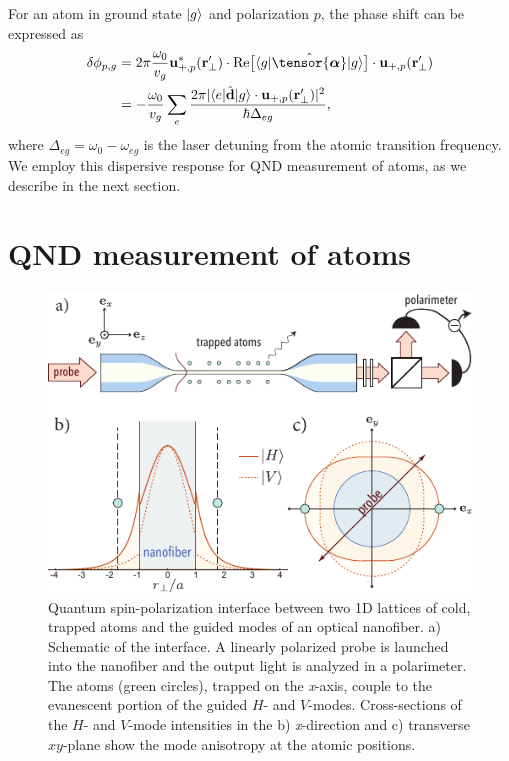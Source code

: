 \documentclass[aps,pra,twocolumn]{revtex4-1} %
\begin{document}
For an atom in ground state $\lvert{g}\rangle$ and polarization $p$, the phase shift can be expressed as \cite{le_kien_propagation_2014}
	\begin{align} \label{Eq::PhaseShiftMultilevel}
		\delta  \phi_{p,g} &=2\pi \frac{ \omega_{0}}{v_g} \mathbf{u}^*_{+, p}(\br'_\perp) \cdot {\rm Re}\big[\bra{g} 
\hat{\tensor{\boldsymbol{\alpha}}} \ket{g} \big] \cdot \mathbf{u}_{+, p}(\br'_\perp) \nn\\
&= - \frac{ \omega_{0} }{v_g} \sum_e \frac{2 \pi |\bra{e}\hat{\mathbf{d}}\ket{g} \cdot \mathbf{u}_{+,p}(\br'_\perp)|^2}{ \hbar  \Delta_{eg} } ,
	\end{align}
where $\Delta_{eg} = \omega_0 - \omega_{eg}$ is the laser detuning from the atomic transition frequency.  
We employ this dispersive response for QND measurement of atoms, as we describe in the next section.



\section{QND measurement of atoms} \label{Sec::QNDMeasurement}

\begin{figure}[t]
\includegraphics[scale=1]{./Figs/Fig_NanofiberSchematic}
\caption{Quantum spin-polarization interface between two 1D lattices of cold, trapped atoms and the guided modes of an optical nanofiber. a) Schematic of the interface. 
A linearly polarized probe is launched into the nanofiber and the output light is analyzed in a polarimeter. 
The atoms (green circles), trapped on the \emph{x}-axis, couple to the evanescent portion of the guided $H$- and $V$-modes. 
Cross-sections of the $H$- and $V$-mode intensities in the b) \emph{x}-direction and c) transverse $xy$-plane show the mode anisotropy at the atomic positions. }\label{Fig::Schematic}
\end{figure}
\end{document}
